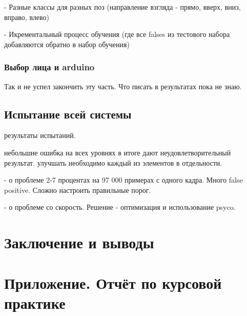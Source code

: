 \documentclass[12pt]{report}
\begin{document}
- Разные классы для разных поз (направление взгляда - прямо, вверх, вниз, вправо, влево)

- Икрементальный процесс обучения (где все falses из тестового набора добавляются обратно в набор обучения)
\subsection{Выбор лица и arduino}
Так и не успел закончить эту часть. Что писать в результатах пока не знаю.
\section{Испытание всей системы}
результаты испытаний.

небольшие ошибка на всех уровнях в итоге дают неудовлетворительный результат. улучшать необходимо каждый из элементов в отдельности.

- о проблеме 2-7 процентах на 97 000 примерах с одного кадра. Много false positive. Сложно настроить правильные порог.

- о проблеме со скорость. Решение - оптимизация и использование psyco.

\chapter*{Заключение и выводы}
\thispagestyle{fancy}


\appendix
\chapter{Приложение. Отчёт по курсовой практике}









\end{document}
